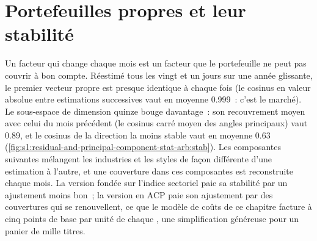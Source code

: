 \begin{omfigure}

\label{fig:s1:residual-and-principal-component-stat-arb:path}
\end{omfigure}

\section{Portefeuilles propres et leur stabilité}

Un facteur qui change chaque mois est un facteur que le portefeuille ne peut pas couvrir à bon compte. Réestimé tous les vingt et un jours sur une année glissante, le premier vecteur propre est
presque identique à chaque fois (le cosinus en valeur absolue entre estimations successives vaut en moyenne 0.999~: c'est le marché). Le sous-espace de dimension quinze bouge davantage~:
son recouvrement moyen avec celui du mois précédent (le cosinus carré moyen des angles principaux) vaut 0.89, et le cosinus de la direction la moins stable vaut en moyenne 0.63
(\cref{fig:s1:residual-and-principal-component-stat-arb:stab}). Les composantes suivantes mélangent les industries et les styles de façon différente d'une estimation à l'autre, et
une couverture dans ces composantes est reconstruite chaque mois. La version fondée sur l'indice sectoriel paie sa stabilité par un ajustement moins bon~; la version en ACP paie son ajustement par des couvertures qui se
renouvellent, ce que le modèle de coûts de ce chapitre facture à cinq points de base par unité de chaque , une simplification généreuse pour un panier de
mille titres.

